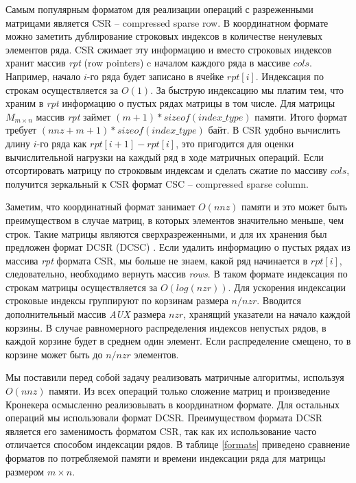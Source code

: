 \documentclass[14pt]{extarticle}
\newcommand{\txt}{\textit}
\begin{document}
	Самым популярным форматом для реализации операций с разреженными матрицами является CSR – compressed sparse row. В координатном формате можно заметить дублирование строковых индексов в количестве ненулевых элементов ряда. CSR сжимает эту информацию и вместо строковых индексов хранит массив \txt{rpt} (row pointers) c началом каждого ряда в массиве $cols$. Например, начало $i$-го ряда будет записано в ячейке $rpt[i]$. Индексация по строкам осуществляется за $O(1)$. За быструю индексацию мы платим тем, что храним в \txt{rpt} информацию о пустых рядах матрицы в том числе. Для матрицы $M_{m \times n}$ массив \txt{rpt} займет $(m + 1) * sizeof (index\_type)$ памяти. Итого формат требует $(nnz + m + 1) * sizeof (index\_type)$ байт. В CSR удобно вычислить длину $i$-го ряда как $rpt[i+1]-rpt[i]$, это пригодится для оценки вычислительной нагрузки на каждый ряд в ходе матричных операций. 
	Если отсортировать матрицу по строковым индексам и сделать сжатие по массиву $cols$, получится зеркальный к CSR формат CSC – compressed sparse column. 
	
	Заметим, что координатный формат занимает $O(nnz)$ памяти и это может быть преимуществом в случае матриц, в которых элементов значительно меньше, чем строк. Такие матрицы являются сверхразреженными, и для их хранения был предложен формат DCSR (DCSC) \cite{dcsr}. Если удалить информацию о пустых рядах из массива \txt{rpt} формата CSR, мы больше не знаем, какой ряд начинается в $rpt[i]$, следовательно, необходимо вернуть массив \txt{rows}. В таком формате индексация по строкам матрицы осуществляется за $O(log(nzr))$. Для ускорения индексации строковые индексы группируют по корзинам размера $n/nzr$. Вводится дополнительный массив \textit{AUX} размера $nzr$, хранящий указатели на начало каждой корзины. В случае равномерного распределения индексов непустых рядов, в каждой корзине будет в среднем один элемент. Если распределение смещено, то в корзине может быть до $n/nzr$ элементов. 
	
	Мы поставили перед собой задачу реализовать матричные алгоритмы, используя $O(nnz)$ памяти. Из всех операций только сложение матриц и произведение Кронекера осмысленно реализовывать в координатном формате.  Для остальных операций мы использовали формат DCSR. Преимуществом формата DCSR является его заменимость форматом CSR, так как их использование часто отличается  способом индексации рядов. 
	В таблице \ref{formats} приведено сравнение форматов по потребляемой памяти и времени индексации ряда для матрицы размером $m\times n$. 
		
\end{document}

